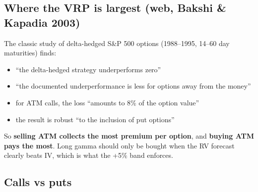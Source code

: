 \documentclass{article}
\begin{document}
\subsection{Where the VRP is largest (web, Bakshi \& Kapadia 2003)}

The classic study of delta-hedged S\&P 500 options (1988--1995, 14--60 day maturities) finds:

\begin{itemize}

\item ``the delta-hedged strategy underperforms zero''

\item ``the documented underperformance is less for options away from the money''

\item for ATM calls, the loss ``amounts to 8\% of the option value''

\item the result is robust ``to the inclusion of put options''

\end{itemize}

So \textbf{selling ATM collects the most premium per option}, and \textbf{buying ATM pays the most}. Long gamma should only be bought when the RV forecast clearly beats IV, which is what the +5\% band enforces.

\subsection{Calls vs puts}
\end{document}
